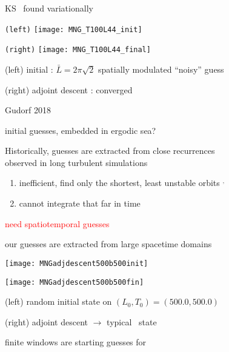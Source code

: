 \begin{frame}{KS \twot\ found variationally}
\begin{minipage}[height=.72\textheight]{.40\textwidth}
\centering \small{\texttt{(left)}}
\texttt{[image: MNG\_T100L44\_init]}
\end{minipage}
\begin{minipage}[height=.72\textheight]{.40\textwidth}
\centering \small{\texttt{(right)}}
\texttt{[image: MNG\_T100L44\_final]}
\end{minipage}

\vfill
(left) initial : $\bar{L}=2\pi\sqrt{2}$ spatially modulated ``noisy'' guess

(right) adjoint descent : converged \twot\

\vfill\hfill        Gudorf 2018
\end{frame}

\begin{frame}{initial guesses, embedded in ergodic sea?}
\begin{block}{Historically, }
guesses are extracted from close recurrences \\
observed in long turbulent simulations
\end{block}
\bigskip\bigskip
            \begin{enumerate}
              \item
inefficient, find only the shortest, least unstable orbits%
$^,$
              \item
cannot integrate that far in time
            \end{enumerate}

\vfill\hfill\textcolor{red}{\huge need spatiotemporal guesses}
\end{frame}

\begin{frame}{our guesses are extracted from large spacetime domains}
\begin{minipage}[height=.45\textwidth]{.45\textwidth}
\centering %
\texttt{[image: MNGadjdescent500b500init]}
\end{minipage}
\begin{minipage}[height=.45\textwidth]{.45\textwidth}
\centering %
\texttt{[image: MNGadjdescent500b500fin]}
\end{minipage}

(left) random initial state on
$(L_0,T_0)=(500.0,500.0)$

(right) adjoint descent $\to$ typical \KS\ state

\vfill\hfill
finite windows are starting guesses for \twots
\end{frame}

